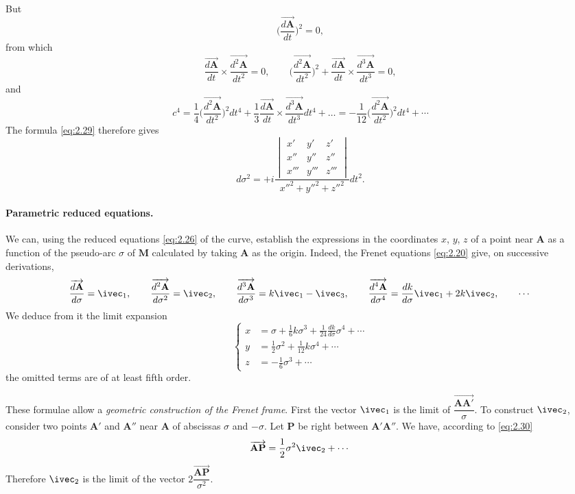 But
\[
\biggl(\frac{\overrightarrow{d\mathbf{A}}}{dt}\biggr)^{2}=0,
\]
from which
\[
\frac{\overrightarrow{d\mathbf{A}}}{dt}\times\frac{\overrightarrow{d^{2}\mathbf{A}}}{dt^{2}}=0,\qquad\biggl(\frac{\overrightarrow{d^{2}\mathbf{A}}}{dt^{2}}\biggr)^{2}+\frac{\overrightarrow{d\mathbf{A}}}{dt}\times\frac{\overrightarrow{d^{3}\mathbf{A}}}{dt^{3}}=0,
\]
and
\[
c^{4}=\frac{1}{4}\biggl(\frac{\overrightarrow{d^{2}\mathbf{A}}}{dt^{2}}\biggr)^{2}dt^{4}+\frac{1}{3}\frac{\overrightarrow{d\mathbf{A}}}{dt}\times\frac{\overrightarrow{d^{3}\mathbf{A}}}{dt^{3}}dt^{4}+\dots=-\frac{1}{12}\biggl(\frac{\overrightarrow{d^{2}\mathbf{A}}}{dt^{2}}\biggr)^{2}dt^{4}+\cdots
\]
The formula \eqref{eq:2.29} therefore gives
\[
d\sigma^{2}=+i\frac{
  \begin{vmatrix}
  x'&y'&z'\\
  x''&y''&z''\\
  x'''&y'''&z'''    
  \end{vmatrix}
}{x''^{2}+y''^{2}+z''^{2}}dt^{2}.
\]

\paragraph{Parametric reduced equations.}
\label{sec:41}
We can, using the reduced equations \eqref{eq:2.26} of the curve, establish the expressions in the coordinates $x$, $y$, $z$ of a point near $\mathbf{A}$ as a function of the pseudo-arc $\sigma$ of $\mathbf{M}$ calculated by taking $\mathbf{A}$ as the origin. Indeed, the Frenet equations \eqref{eq:2.20} give, on successive derivations,
\[
\frac{\overrightarrow{d\mathbf{A}}}{d\sigma}=\ivec_{1},\qquad
\frac{\overrightarrow{d^{2}\mathbf{A}}}{d\sigma^{2}}=\ivec_{2},\qquad
\frac{\overrightarrow{d^{3}\mathbf{A}}}{d\sigma^{3}}=k\ivec_{1}-\ivec_{3},\qquad
\frac{\overrightarrow{d^{4}\mathbf{A}}}{d\sigma^{4}}=\frac{dk}{d\sigma}\ivec_{1}+2k\ivec_{2},\qquad
\cdots
\]
We deduce from it the limit expansion
\begin{equation}
  \label{eq:2.30}
  \left\{
    \begin{aligned}
      x&=\sigma+\frac{1}{6}k\sigma^{3}+\frac{1}{24}\frac{dk}{d\sigma}\sigma^{4}+\cdots\\
      y&=\frac{1}{2}\sigma^{2}+\frac{1}{12}k\sigma^{4}+\cdots\\
      z&=-\frac{1}{6}\sigma^{3}+\cdots
    \end{aligned}
  \right.
\end{equation}
the omitted terms are of at least fifth order.

These formulae allow a \emph{geometric construction of the Frenet frame}. First the vector $\ivec_{1}$ is the limit of $\dfrac{\overrightarrow{\mathbf{AA}'}}{\sigma}$. To construct $\ivec_{2}$, consider two points $\mathbf{A}'$ and $\mathbf{A}''$ near $\mathbf{A}$ of abscissas $\sigma$ and $-\sigma$. Let $\mathbf{P}$ be right between $\mathbf{A}'\mathbf{A}''$. We have, according to \eqref{eq:2.30}
\[
\overrightarrow{\mathbf{AP}}=\frac{1}{2}\sigma^{2}\ivec_{2}+\cdots
\]
Therefore $\ivec_{2}$ is the limit of the vector $2\dfrac{\overrightarrow{\mathbf{AP}}}{\sigma^{2}}$.

